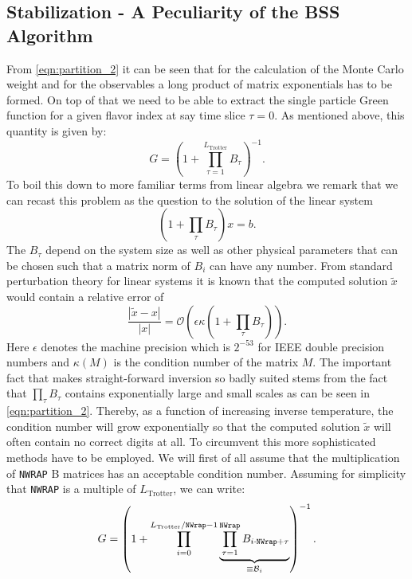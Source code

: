 %
\subsection{Stabilization - A Peculiarity of the BSS Algorithm}\label{sec:stable}
%
From \eqref{eqn:partition_2} it can be seen that for the calculation of the Monte Carlo weight
and for the observables a long product of matrix exponentials has to be formed.
On top of that we need to be able to extract the single particle Green function  for a given flavor index at say time slice $\tau = 0$.  As  mentioned above, this quantity is given by: 
\begin{equation}
G = \left( 1 + \prod_{ \tau= 1}^{L_{\text{Trotter}}} B_\tau \right)^{-1}.
\end{equation}
To boil this down to more familiar terms from linear algebra we remark that we can recast this problem as the question to the solution of the linear system
\begin{equation}
(1 + \prod_\tau B_\tau) x = b.
\end{equation}
The $B_\tau$ depend on the system size as well as other physical parameters that can be chosen such that a matrix norm of $B_i$ can have any number.
From standard perturbation theory for linear systems it is known that the computed solution $\tilde{x}$ would 
contain a relative error of
\begin{equation}
\frac{|\tilde{x} - x|}{|x|} = \mathcal{O}\left(\epsilon \kappa(1 + \prod_\tau B_\tau)\right).
\end{equation}
Here $\epsilon$ denotes the machine precision which is $2^{-53}$ for IEEE double precision numbers
and $\kappa(M)$ is the condition number of the matrix $M$.
The important fact that makes straight-forward inversion so badly suited  stems from the fact that $  \prod_ \tau B_\tau $ contains exponentially large and small scales as can be seen in \eqref{eqn:partition_2}.  Thereby, as a function of increasing inverse temperature, 
the condition number  will grow exponentially so that the computed solution $\tilde{x}$
will often contain no correct digits at all.
To circumvent this more sophisticated methods have to be employed.   We will first of all assume that  the multiplication of  \texttt{NWRAP}  B matrices   has an acceptable condition number.   Assuming for simplicity that \texttt{NWRAP} is a multiple of  $L_{\text{Trotter}}$, we  can write: 
\begin{equation}
G = \left( 1 + \prod_{ i = 0}^{L_{\text{Trotter}} /\texttt{NWrap} -1}       \underbrace{\prod_{\tau=1}^{\texttt{NWrap}} B_{i  \cdot  \texttt{NWrap}+ \tau} }_{ \equiv {\cal B}_i}\right)^{-1}.
\end{equation}

